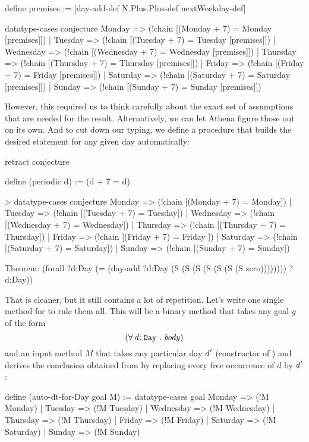 \begin{tcAthena}
define premises := [day-add-def N.Plus.Plus-def nextWeekday-def]

datatype-cases conjecture {
  Monday    => (!chain [(Monday + 7)    = Monday     [premises]])
| Tuesday   => (!chain [(Tuesday + 7)   = Tuesday    [premises]])
| Wednesday => (!chain [(Wednesday + 7) = Wednesday  [premises]])
| Thursday  => (!chain [(Thursday + 7)  = Thursday   [premises]])
| Friday    => (!chain [(Friday + 7)    = Friday     [premises]])
| Saturday  => (!chain [(Saturday + 7)  = Saturday   [premises]])
| Sunday    => (!chain [(Sunday + 7)    = Sunday     [premises]])
}
\end{tcAthena}
However, this required us to think carefully about the exact set of assumptions that are needed for the result. 
Alternatively, we can let Athena figure those out on its own. And to cut down our typing, we define a procedure
that builds the desired statement for any given day automatically:
\begin{tcAthena}
retract conjecture

define (periodic d) := (d + 7 = d)

> datatype-cases conjecture {
  Monday    => (!chain [(Monday + 7)    = Monday])
| Tuesday   => (!chain [(Tuesday + 7)   = Tuesday])
| Wednesday => (!chain [(Wednesday + 7) = Wednesday])
| Thursday  => (!chain [(Thursday + 7)  = Thursday])
| Friday    => (!chain [(Friday + 7)    = Friday ])
| Saturday  => (!chain [(Saturday + 7)  = Saturday])
| Sunday    => (!chain [(Sunday + 7)    = Sunday])
}

Theorem: (forall ?d:Day
           (= (day-add ?d:Day
                       (S (S (S (S (S (S (S zero))))))))
              ?d:Day))
\end{tcAthena}
That is cleaner, but it still contains a lot of repetition. 
Let's write one single  method for  to rule them all.
This will be a binary method that takes any goal $g$ of the form 
\[(\forall\: \typedec{d}\smtt{Day} \qdot \temv{body})\]
and an input method $M$ that takes any particular day $\raisedprime{d}$ (constructor of ) and derives 
the conclusion obtained from  by replacing every free occurrence of $d$ by $\raisedprime{d}$: 
\begin{tcAthena}
define (auto-dt-for-Day goal M) := 
  datatype-cases goal {
    Monday =>    (!M Monday)
  | Tuesday =>   (!M Tuesday)
  | Wednesday => (!M Wednesday)
  | Thursday =>  (!M Thursday)
  | Friday =>    (!M Friday)
  | Saturday =>  (!M Saturday)
  | Sunday =>    (!M Sunday)
  }
\end{tcAthena}
